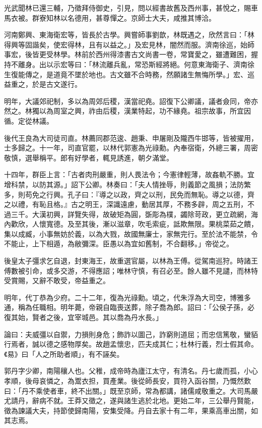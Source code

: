 \begin{pinyinscope}
光武聞林已還三輔，乃徵拜侍御史，引見，問以經書故舊及西州事，甚悅之，賜車馬衣被。群寮知林以名德用，甚尊憚之。京師士大夫，咸推其博洽。

河南鄭興、東海衛宏等，皆長於古學。興嘗師事劉歆，林既遇之，欣然言曰：「林得興等固諧矣，使宏得林，且有以益之。」及宏見林，闇然而服。濟南徐巡，始師事宏，後皆更受林學。林前於西州得漆書古文尚書一卷，常寶愛之，雖遭難困，握持不離身。出以示宏等曰：「林流離兵亂，常恐斯經將絕。何意東海衛子、濟南徐生復能傳之，是道竟不墜於地也。古文雖不合時務，然願諸生無悔所學。」宏、巡益重之，於是古文遂行。

明年，大議郊祀制，多以為周郊后稷，漢當祀堯。詔復下公卿議，議者僉同，帝亦然之。林獨以為周室之興，祚由后稷，漢業特起，功不緣堯。祖宗故事，所宜因循。定從林議。

後代王良為大司徒司直。林薦同郡范逡、趙秉、申屠剛及隴西牛邯等，皆被擢用，士多歸之。十一年，司直官罷，以林代郭憲為光祿勳。內奉宿衛，外總三署，周密敬慎，選舉稱平。郎有好學者，輒見誘進，朝夕滿堂。

十四年，群臣上言：「古者肉刑嚴重，則人畏法令；今憲律輕薄，故姦軌不勝。宜增科禁，以防其源。」詔下公卿。林奏曰：「夫人情挫辱，則義節之風損；法防繁多，則苟免之行興。孔子曰：『導之以政，齊之以刑，民免而無恥。導之以德，齊之以禮，有恥且格。』古之明王，深識遠慮，動居其厚，不務多辟，周之五刑，不過三千。大漢初興，詳覽失得，故破矩為圓，斲彫為樸，蠲除苛政，更立疏網，海內歡欣，人懷寬德。及至其後，漸以滋章，吹毛索疵，詆欺無限。果桃菜茹之饋，集以成臧，小事無妨於義，以為大戮，故國無廉士，家無完行。至於法不能禁，令不能止，上下相遁，為敝彌深。臣愚以為宜如舊制，不合翻移。」帝從之。

後皇太子彊求乞自退，封東海王，故重選官屬，以林為王傅。從駕南巡狩。時諸王傅數被引命，或多交游，不得應詔；唯林守慎，有召必至。餘人雖不見譴，而林特受賞賜，又辭不敢受，帝益重之。

明年，代丁恭為少府。二十二年，復為光祿勳。頃之，代朱浮為大司空，博雅多通，稱為任職相。明年薨，帝親自臨喪送葬，除子喬為郎。詔曰：「公侯子孫，必復其始，賢者之後，宜宰城邑。其以喬為丹水長。」

論曰：夫威彊以自禦，力損則身危；飾詐以圖己，詐窮則道屈；而忠信篤敬，蠻貊行焉者，誠以德之感物厚矣。故趙孟懷忠，匹夫成其仁；杜林行義，烈士假其命。《易》曰「人之所助者順」，有不誣矣。

郭丹字少卿，南陽穰人也。父稚，成帝時為廬江太守，有清名。丹七歲而孤，小心孝順，後母哀憐之，為鬻衣担，買產業。後從師長安，買符入函谷關，乃慨然歎曰：「丹不乘使者車，終不出關。」既至京師，常為都講，諸儒咸敬重之。大司馬嚴尤請丹，辭病不就。王莽又徵之，遂與諸生逃於北地。更始二年，三公舉丹賢能，徵為諫議大夫，持節使歸南陽，安集受降。丹自去家十有二年，果乘高車出關，如其志焉。


\end{pinyinscope}
